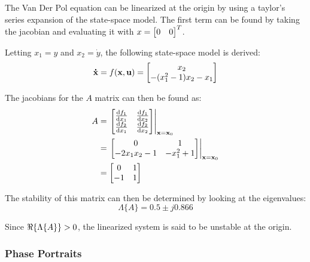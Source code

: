 \documentclass[letter]{article}
\begin{document}
The Van Der Pol equation can be linearized at the origin by using a taylor's series expansion of the state-space model. The first term can be found by taking the jacobian and evaluating it with $x=\mqty[0&0]^T$.

Letting $x_1 = y$ and $x_2 = \dot{y}$, the following state-space model is derived:
\begin{displaymath}
	\vb{\dot{x}} = f(\vb{x},\vb{u}) = \mqty[x_2 \\ -(x_1^2 - 1) x_2 - x_1]
\end{displaymath}

The jacobians for the $A$ matrix can then be found as:
\begin{align*}
	A 	&= \eval{\mqty[\dv{f_1}{x_1}& \dv{f_1}{x_2}\\ \dv{f_2}{x_1} & \dv{f_2}{x_2}]}_{\vb{x}= \vb{x}_0}\\
		&= \eval{\mqty[0 & 1\\ -2 x_1 x_2 -1 & -x_1^2 +1]}_{\vb{x} = \vb{x}_0}\\
		&= \mqty[0 & 1 \\ -1 &1]
\end{align*}

The stability of this matrix can then be determined by looking at the eigenvalues:
\begin{displaymath}
	\Lambda\{A\} = 0.5 \pm j 0.866
\end{displaymath}

Since $\real\{\Lambda\{A\}\} > 0$, the linearized system is said to be unstable at the origin.

\newpage
\subsubsection{Phase Portraits}
\end{document}
